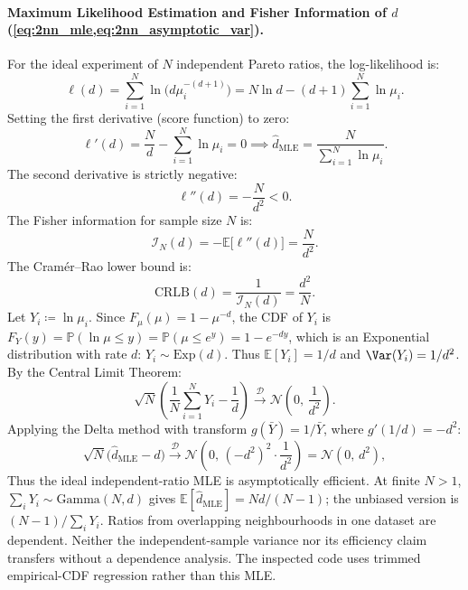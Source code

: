 \paragraph{Maximum Likelihood Estimation and Fisher Information of
$d$ (\cref{eq:2nn_mle,eq:2nn_asymptotic_var}).}
For the ideal experiment of $N$ independent Pareto ratios, the
log-likelihood is:
\begin{equation}
  \ell(d) = \sum_{i=1}^N \ln\bigl(d \mu_i^{-(d+1)}\bigr) = N \ln d -
  (d + 1)\sum_{i=1}^N \ln\mu_i.
\end{equation}
Setting the first derivative (score function) to zero:
\begin{equation}
  \ell'(d) = \frac{N}{d} - \sum_{i=1}^N \ln\mu_i = 0 \implies
  \hat{d}_{\mathrm{MLE}} = \frac{N}{\sum_{i=1}^N \ln\mu_i}.
\end{equation}
The second derivative is strictly negative:
\begin{equation}
  \ell''(d) = -\frac{N}{d^2} < 0.
\end{equation}
The Fisher information for sample size $N$ is:
\begin{equation}
  \mathcal{I}_N(d) = -\mathbb{E}\bigl[\ell''(d)\bigr] = \frac{N}{d^2}.
\end{equation}
The Cram\'er--Rao lower bound is:
\begin{equation}
  \mathrm{CRLB}(d) = \frac{1}{\mathcal{I}_N(d)} = \frac{d^2}{N}.
\end{equation}
Let $Y_i \coloneqq \ln\mu_i$. Since $F_\mu(\mu) = 1 - \mu^{-d}$, the
CDF of $Y_i$ is $F_Y(y) = \mathbb{P}(\ln\mu \le y) = \mathbb{P}(\mu
\le e^y) = 1 - e^{-dy}$,
which is an Exponential distribution with rate $d$: $Y_i \sim \mathrm{Exp}(d)$.
Thus $\mathbb{E}[Y_i] = 1/d$ and $\Var(Y_i) = 1/d^2$.
By the Central Limit Theorem:
\begin{equation}
  \sqrt{N}\left( \frac{1}{N}\sum_{i=1}^N Y_i - \frac{1}{d} \right)
  \xrightarrow{\mathcal{D}} \mathcal{N}\left(0, \, \frac{1}{d^2}\right).
\end{equation}
Applying the Delta method with transform $g(\bar{Y}) = 1/\bar{Y}$,
where $g'(1/d) = -d^2$:
\begin{equation}
  \sqrt{N}\bigl(\hat{d}_{\mathrm{MLE}} - d\bigr)
  \xrightarrow{\mathcal{D}} \mathcal{N}\left(0, \, (-d^2)^2 \cdot
  \frac{1}{d^2}\right) = \mathcal{N}(0, \, d^2),
\end{equation}
Thus the ideal independent-ratio MLE is asymptotically efficient.
At finite $N>1$, $\sum_iY_i\sim\mathrm{Gamma}(N,d)$ gives
$\mathbb{E}[\hat d_{\mathrm{MLE}}]=Nd/(N-1)$; the unbiased version is
$(N-1)/\sum_iY_i$. Ratios from overlapping neighbourhoods in one dataset
are dependent. Neither the independent-sample variance nor its efficiency
claim transfers without a dependence analysis. The inspected code uses
trimmed empirical-CDF regression rather than this MLE.

